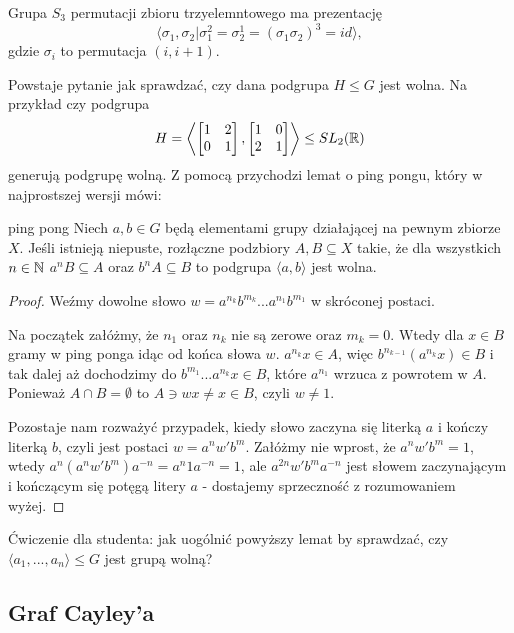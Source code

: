 \begin{example}
Grupa $S_3$ permutacji zbioru trzyelemntowego ma prezentację 
$$\langle \sigma_1, \sigma_2|\sigma_1^2=\sigma_2^1=(\sigma_1\sigma_2)^3=id\rangle,$$ 
gdzie $\sigma_i$ to permutacja $(i, i+1)$.
\end{example}

Powstaje pytanie jak sprawdzać, czy dana podgrupa $H\leq G$ jest wolna. Na przykład czy podgrupa
$$H=\left\langle\begin{bmatrix}1&2\\0&1\end{bmatrix},\begin{bmatrix}1&0\\2&1\end{bmatrix}\right\rangle\leq SL_2(\mathbb{R})$$ 
generują podgrupę wolną. Z pomocą przychodzi lemat o ping pongu, który w najprostszej wersji mówi:

\begin{lemma}{ping pong}{}
  Niech $a, b\in G$ będą elementami grupy działającej na pewnym zbiorze $X$. Jeśli istnieją niepuste, rozłączne podzbiory $A,B\subseteq X$ takie, że dla wszystkich $n\in \mathbb{N}$ $a^nB\subseteq A$ oraz $b^nA\subseteq B$ to podgrupa $\langle a,b\rangle$ jest wolna.
\end{lemma}

\begin{proof}
  Weźmy dowolne słowo $w=a^{n_k}b^{m_k}...a^{n_1}b^{m_1}$ w skróconej postaci. 

  Na początek załóżmy, że $n_1$ oraz $n_k$ nie są zerowe oraz $m_k=0$. Wtedy dla $x\in B$ gramy w ping ponga idąc od końca słowa $w$. $a^{n_k}x\in A$, więc $b^{n_{k-1}}(a^{n_k}x)\in B$ i tak dalej aż dochodzimy do $b^{m_1}...a^{n_k}x\in B$, które $a^{n_1}$ wrzuca z powrotem w $A$. Ponieważ $A\cap B=\emptyset$ to $A\ni wx\neq x\in B$, czyli $w\neq 1$. 

  Pozostaje nam rozważyć przypadek, kiedy słowo zaczyna się literką $a$ i kończy literką $b$, czyli jest postaci $w=a^n w'b^m$. Załóżmy nie wprost, że $a^nw'b^m=1$, wtedy $a^n(a^nw'b^m)a^{-n}=a^n1a^{-n}=1$, ale $a^{2n}w'b^ma^{-n}$ jest słowem zaczynającym i kończącym się potęgą litery $a$ - dostajemy sprzeczność z rozumowaniem wyżej.
\end{proof}

Ćwiczenie dla studenta: jak uogólnić powyższy lemat by sprawdzać, czy $\langle a_1,...,a_n\rangle\leq G$ jest grupą wolną?

\subsection{Graf Cayley'a}

